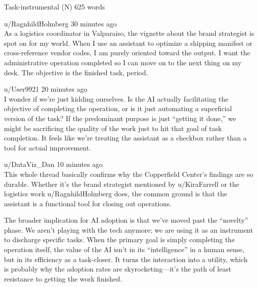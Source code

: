 \begin{corpusdoc}[SPgray]{Task-instrumental (N) \hfill 625 words}
\docrule

u/RagnhildHolmberg \textbullet{} 30 minutes ago\\
As a logistics coordinator in Valparaiso, the vignette about the brand strategist is spot on for my world. When I use an assistant to optimize a shipping manifest or cross-reference vendor codes, I am purely oriented toward the output. I want the administrative operation completed so I can move on to the next thing on my desk. The objective is the finished task, period.

\docrule

u/User9921 \textbullet{} 20 minutes ago\\
I wonder if we're just kidding ourselves. Is the AI actually facilitating the objective of completing the operation, or is it just automating a superficial version of the task? If the predominant purpose is just ``getting it done,'' we might be sacrificing the quality of the work just to hit that goal of task completion. It feels like we're treating the assistant as a checkbox rather than a tool for actual improvement.

\docrule

u/DataViz\_Dan \textbullet{} 10 minutes ago\\
This whole thread basically confirms why the Copperfield Center's findings are so durable. Whether it's the brand strategist mentioned by u/KiraFarrell or the logistics work u/RagnhildHolmberg does, the common ground is that the assistant is a functional tool for closing out operations.

The broader implication for AI adoption is that we've moved past the ``novelty'' phase. We aren't playing with the tech anymore; we are using it as an instrument to discharge specific tasks. When the primary goal is simply completing the operation itself, the value of the AI isn't in its ``intelligence'' in a human sense, but in its efficiency as a task-closer. It turns the interaction into a utility, which is probably why the adoption rates are skyrocketing---it's the path of least resistance to getting the work finished.
\end{corpusdoc}

